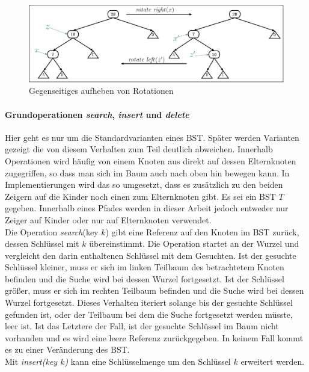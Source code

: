 \documentclass[a4paper,12pt]{article}
\begin{document}
\begin{figure}[h]
	\centering
	\includegraphics[width= 1.2\textwidth]{"Medien/Einleitung/LinksRechtsRotation"}
	\caption{Gegenseitiges aufheben von Rotationen}
	\label{fig:LinksRechtsRotation}
\end{figure}

\paragraph{Grundoperationen \textit{search}, \textit{insert} und \textit{delete}} \label{BST Operationen}
Hier geht es nur um die Standardvarianten eines BST. Später werden Varianten gezeigt die von diesem Verhalten zum Teil deutlich abweichen. Innerhalb Operationen wird häufig von einem Knoten aus direkt
auf dessen Elternknoten zugegriffen, so dass man sich im Baum auch nach oben hin bewegen kann. In Implementierungen wird das so umgesetzt, dass es zusätzlich zu den beiden Zeigern auf die Kinder noch einen zum Elternknoten gibt. Es sei ein BST $T$ gegeben. Innerhalb eines Pfades werden in dieser Arbeit jedoch entweder nur Zeiger auf Kinder oder nur auf Elternknoten verwendet.  \\
Die Operation \textit{search}(key $k$) gibt eine Referenz auf den Knoten im BST zurück, dessen Schlüssel mit $k$ übereinstimmt. Die Operation startet an der Wurzel und vergleicht den darin enthaltenen Schlüssel mit dem Gesuchten. Ist der gesuchte Schlüssel kleiner, muss er sich im linken Teilbaum des betrachtetem Knoten befinden und die Suche wird bei dessen Wurzel fortgesetzt. Ist der Schlüssel größer, muss er sich im rechten Teilbaum befinden und die Suche wird bei dessen Wurzel fortgesetzt. Dieses Verhalten iteriert solange bis der gesuchte Schlüssel gefunden ist, oder der Teilbaum bei dem die Suche fortgesetzt werden müsste, leer ist. Ist das Letztere der Fall, ist der gesuchte Schlüssel im Baum nicht vorhanden und es wird eine leere Referenz zurückgegeben. In keinem Fall kommt es zu einer Veränderung des BST.\\
Mit \textit{insert(key $k$)}  kann eine Schlüsselmenge um den Schlüssel $k$ erweitert werden. 
\end{document}
